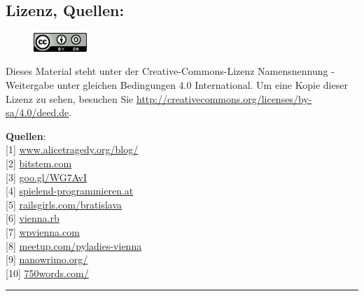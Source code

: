 \documentclass[10pt,a4paper,ngerman,twoside]{article} %
\newcommand{\SepRule}{\noindent	%
\begin{center}
\rule{250pt}{1pt} %
\end{center}
}
\begin{document}
\begin{multicols}{3}
\subsection*{Lizenz, Quellen:}

\begin{figure}
\includegraphics[width=2cm]{ccbysa88x31.png}
\end{figure}
Dieses Material steht unter der Creative-Commons-Lizenz Namensnennung - Weitergabe unter gleichen Bedingungen 4.0 International. Um eine Kopie dieser Lizenz zu sehen, besuchen Sie \url{http://creativecommons.org/licenses/by-sa/4.0/deed.de}.

\textbf{Quellen}: \\
{[}1{]} \href{http://www.alicetragedy.org/blog/}{www.alicetragedy.org/blog/} \\
{[}2{]} \href{http://bitstem.com}{bitstem.com} \\
{[}3{]} \href{http://www.alicetragedy.org/blog/?p=6271}{goo.gl/WG7AvI} \\
{[}4{]} \href{http://spielend-programmieren.at}{spielend-programmieren.at} \\
{[}5{]} \href{http://railsgirls.com/bratislava}{railsgirls.com/bratislava} \\
{[}6{]} \href{http://vienna-rb.at/}{vienna.rb} \\
{[}7{]} \href{http://wpvienna.com/}{wpvienna.com} \\
{[}8{]} \href{http://www.meetup.com/pyladies-vienna}{meetup.com/pyladies-vienna} \\
{[}9{]} \href{http://nanowrimo.org/}{nanowrimo.org/} \\
{[}10{]} \href{https://750words.com/}{750words.com/} 


\end{multicols}
\SepRule
\end{document}
